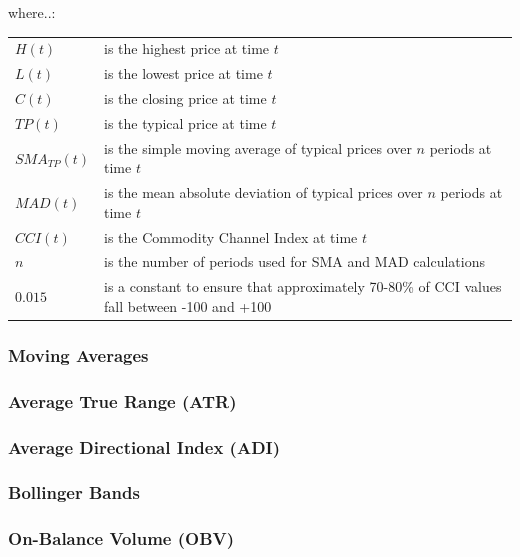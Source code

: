 \documentclass[a4paper,12pt]{report}
\begin{document}
\begin{minipage}{\textwidth}

where..:\\

\begin{tabularx}{\textwidth}{@{}l@{\hspace{2em}--\hspace{2em}}X@{}}
  $H(t)$         & is the highest price at time $t$ \\
  $L(t)$         & is the lowest price at time $t$ \\
  $C(t)$         & is the closing price at time $t$ \\
  $TP(t)$        & is the typical price at time $t$ \\
  $SMA_{TP}(t)$  & is the simple moving average of typical prices over $n$ periods at time $t$ \\
  $MAD(t)$       & is the mean absolute deviation of typical prices over $n$ periods at time $t$ \\
  $CCI(t)$       & is the Commodity Channel Index at time $t$ \\
  $n$            & is the number of periods used for SMA and MAD calculations \\
  $0.015$        & is a constant to ensure that approximately 70-80\% of CCI values fall between -100 and +100 \\
\end{tabularx}

\end{minipage}

			\subsubsection{Moving Averages}
			\subsubsection{Average True Range (ATR)}
			\subsubsection{Average Directional Index (ADI)}
			\subsubsection{Bollinger Bands}
			\subsubsection{On-Balance Volume (OBV)}
\end{document}
